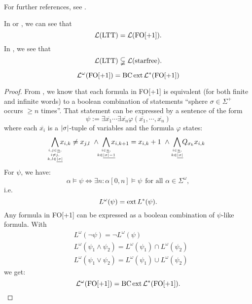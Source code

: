 For further references, see \cite[IV.3]{FinAutLogR109}.

In \cite[IV.3.3]{FinAutLogR109} or \cite[Corollary 4.9]{LangAutLogicR102}, we can see that
\[  \mathcal{L}(\textup{\textrm{LTT}}) = \mathcal{L}(\mathrm{FO[+1]}). \]
In \cite[IV.3.4]{FinAutLogR109}, we see that
\[  \mathcal{L}(\textup{\textrm{LTT}}) \subsetneqq \mathcal{L}(\textup{\textrm{starfree}}). \]



\begin{theorem}
\[ \mathcal{L}^\omega (\mathrm{FO[+1]}) = \operatorname{BC} \operatorname{ext} \mathcal{L}^*(\mathrm{FO[+1]}) \]
\begin{proof}
From \cite[Theorem 4.8]{LangAutLogicR102}, we know that each formula in FO[+1] is equivalent (for both finite and infinite words) to a boolean combination of statements ``sphere $\sigma \in \Sigma^+$ occurs $\geq n$ times''. That statement can be expressed by a sentence of the form
\[ \psi := \exists \overline{x_1} \dotsb \exists \overline{x_n} \varphi(\overline{x_1}, \dotsb, \overline{x_n}) \]
where each $\overline{x_i}$ is a $\left| \sigma \right|$-tuple of variables and the formula $\varphi$ states:
\[
\bigwedge_{\mathclap{i,j \in \underline{n},\atop { i \neq j,\atop k,l \in \underline{\abs{\sigma}}}}} x_{i,k} \neq x_{j,l}
\ \wedge\ \bigwedge_{\mathclap{i \in \underline{n},\atop k \in \underline{\abs{\sigma}-1}}} x_{i,k+1} = x_{i,k} + 1
\ \wedge\ \bigwedge_{\mathclap{i \in \underline{n},\atop k \in \underline{\abs{\sigma}}}} Q_{\sigma_k} x_{i,k}
\]
For $\psi$, we have:
\[ \alpha \models \psi \Leftrightarrow \exists n \colon \alpha[0,n] \models \psi \ \ \text{for all } \alpha \in \Sigma^\omega , \]
i.e.
\[ L^\omega(\psi) = \operatorname{ext} L^*(\psi) . \]
Any formula in FO[+1] can be expressed as a boolean combination of $\psi$-like formula. With
\begin{align*}
& L^\omega(\neg \psi) = \neg L^\omega(\psi) \\
& L^\omega(\psi_1 \wedge \psi_2) = L^\omega(\psi_1) \cap L^\omega(\psi_2) \\
& L^\omega(\psi_1 \vee \psi_2) = L^\omega(\psi_1) \cup L^\omega(\psi_2)
\end{align*}
we get:
\[ \mathcal{L}^\omega(\mathrm{FO[+1]}) = \operatorname{BC} \operatorname{ext} \mathcal{L}^*(\mathrm{FO[+1]}). \]
\end{proof}
\end{theorem}

